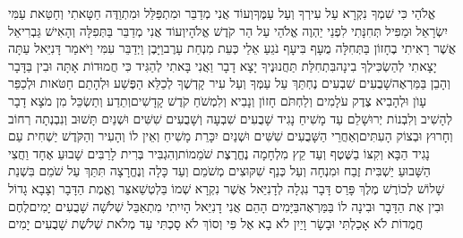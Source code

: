 \documentclass[../main/main.tex]{subfiles}
\begin{document}
\begin{multicols*}{\ncols}
אֱלֹהַי כִּי שִׁמְךָ נִקְרָא עַל עִירְךָ וְעַל עַמֶּךָ\PreVerseSpace{}וְעוֹד אֲנִי מְדַבֵּר וּמִתְפַּלֵּל וּמִתְוַדֶּה חַטָּאתִי וְחַטַּאת עַמִּי יִשְׂרָאֵל וּמַפִּיל תְּחִנָּתִי לִפְנֵי יַהְוֶה אֱלֹהַי עַל הַר קֹדֶשׁ אֱלֹהָי\PreVerseSpace{}וְעוֹד אֲנִי מְדַבֵּר בַּתְּפִלָּה וְהָאִישׁ גַּבְרִיאֵל אֲשֶׁר רָאִיתִי בֶחָזוֹן בַּתְּחִלָּה מֻעָף בִּיעָף נֹגֵעַ אֵלַי כְּעֵת מִנְחַת עָרֶב\PreVerseSpace{}וַיָּבֶן וַיְדַבֵּר עִמִּי וַיֹּאמַר דָּנִיֵּאל עַתָּה יָצָאתִי לְהַשְׂכִּילְךָ בִינָה\PreVerseSpace{}בִּתְחִלַּת תַּחֲנוּנֶיךָ יָצָא דָבָר וַאֲנִי בָּאתִי לְהַגִּיד כִּי חֲמוּדוֹת אָתָּה וּבִין בַּדָּבָר וְהָבֵן בַּמַּרְאֶה\PreVerseSpace{}שָׁבֻעִים שִׁבְעִים נֶחְתַּךְ עַל עַמְּךָ וְעַל עִיר קָדְשֶׁךָ לְכַלֵּא הַפֶּשַׁע וּלְהָתֵם\SubEnd{} חַטֹּאות וּלְכַפֵּר עָוֺן וּלְהָבִיא צֶדֶק עֹלָמִים וְלַחְתֹּם חָזוֹן וְנָבִיא וְלִמְשֹׁחַ קֹדֶשׁ קָדָשִׁים\PreVerseSpace{}וְתֵדַע וְתַשְׂכֵּל מִן מֹצָא דָבָר לְהָשִׁיב וְלִבְנוֹת יְרוּשָׁלֵם עַד מָשִׁיחַ נָגִיד שָׁבֻעִים שִׁבְעָה וְשָׁבֻעִים שִׁשִּׁים וּשְׁנַיִם תָּשׁוּב וְנִבְנְתָה רְחוֹב וְחָרוּץ וּבְצוֹק הָעִתִּים\PreVerseSpace{}וְאַחֲרֵי הַשָּׁבֻעִים שִׁשִּׁים וּשְׁנַיִם יִכָּרֵת מָשִׁיחַ וְאֵין לוֹ וְהָעִיר וְהַקֹּדֶשׁ יַשְׁחִית עַם נָגִיד הַבָּא וְקִצּוֹ בַשֶּׁטֶף וְעַד קֵץ מִלְחָמָה נֶחֱרֶצֶת שֹׁמֵמוֹת\PreVerseSpace{}וְהִגְבִּיר בְּרִית לָרַבִּים שָׁבוּעַ אֶחָד וַחֲצִי הַשָּׁבוּעַ יַשְׁבִּית זֶבַח וּמִנְחָה וְעַל כְּנַף שִׁקּוּצִים מְשֹׁמֵם וְעַד כָּלָה וְנֶחֱרָצָה תִּתַּךְ עַל שֹׁמֵם \ClosedSection{}בִּשְׁנַת שָׁלוֹשׁ לְכוֹרֶשׁ מֶלֶךְ פָּרַס דָּבָר נִגְלָה לְדָנִיֵּאל אֲשֶׁר נִקְרָא שְׁמוֹ בֵּלְטְשַׁאצַּר וֶאֱמֶת הַדָּבָר וְצָבָא גָדוֹל וּבִין אֶת הַדָּבָר וּבִינָה לוֹ בַּמַּרְאֶה\PreVerseSpace{}בַּיָּמִים הָהֵם אֲנִי דָנִיֵּאל הָיִיתִי מִתְאַבֵּל שְׁלֹשָׁה שָׁבֻעִים יָמִים\PreVerseSpace{}לֶחֶם חֲמֻדוֹת לֹא אָכַלְתִּי וּבָשָׂר וָיַיִן לֹא בָא אֶל פִּי וְסוֹךְ לֹא סָכְתִּי עַד מְלֹאת שְׁלֹשֶׁת שָׁבֻעִים יָמִים\OpenSection{}\par

\end{multicols*}
\end{document}
